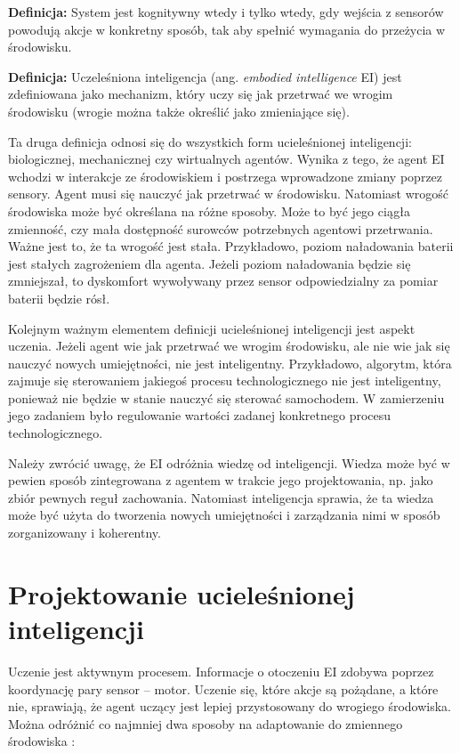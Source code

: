 \textbf{Definicja:} System jest kognitywny wtedy i tylko wtedy, gdy wejścia z 
sensorów powodują akcje w konkretny sposób, tak aby spełnić wymagania do 
przeżycia w środowisku. 


\textbf{Definicja:} Uczeleśniona inteligencja (ang. \textit{embodied 
intelligence} EI) jest zdefiniowana jako mechanizm, który uczy się jak 
przetrwać we wrogim środowisku (wrogie można także określić jako zmieniające 
się).

Ta druga definicja odnosi się do wszystkich form ucieleśnionej inteligencji: 
biologicznej, mechanicznej czy wirtualnych agentów. Wynika z tego, że agent EI 
wchodzi w interakcje ze środowiskiem i postrzega wprowadzone zmiany poprzez 
sensory. Agent musi się nauczyć jak przetrwać w środowisku. Natomiast wrogość 
środowiska może być określana na różne sposoby. Może to być jego ciągła 
zmienność, czy mała dostępność surowców potrzebnych agentowi przetrwania. Ważne 
jest to, że ta wrogość jest stała. Przykładowo, poziom naładowania baterii jest 
stałych zagrożeniem dla agenta. Jeżeli poziom naładowania będzie się 
zmniejszał, to dyskomfort wywoływany przez sensor odpowiedzialny za pomiar 
baterii będzie rósł.

Kolejnym ważnym elementem definicji ucieleśnionej inteligencji jest aspekt 
uczenia. Jeżeli agent wie jak przetrwać we wrogim środowisku, ale nie wie jak 
się nauczyć nowych umiejętności, nie jest inteligentny. Przykładowo, algorytm, 
która zajmuje się sterowaniem jakiegoś procesu technologicznego nie jest 
inteligentny, ponieważ nie będzie w stanie nauczyć się sterować samochodem. W 
zamierzeniu jego zadaniem było regulowanie wartości zadanej konkretnego procesu 
technologicznego.

Należy zwrócić uwagę, że EI odróżnia wiedzę od inteligencji. Wiedza może być w 
pewien sposób zintegrowana z agentem w trakcie jego projektowania, np. jako 
zbiór pewnych reguł zachowania. Natomiast inteligencja sprawia, że ta wiedza 
może być użyta do tworzenia nowych umiejętności i zarządzania nimi w sposób 
zorganizowany i koherentny.

\section{Projektowanie ucieleśnionej inteligencji}

Uczenie jest aktywnym procesem. Informacje o otoczeniu EI zdobywa poprzez 
koordynację pary sensor -- motor. Uczenie się, które akcje są pożądane, a które 
nie, sprawiają, że agent uczący jest lepiej przystosowany do wrogiego 
środowiska. Można odróżnić co najmniej dwa sposoby na adaptowanie do zmiennego 
środowiska \cite{motivation_in_ei}:

